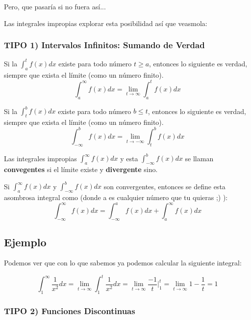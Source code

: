 \documentclass[12pt]{article}							    %
\begin{document}
Pero, que pasaría si no fuera así...

Las integrales impropias explorar esta posibilidad así que veasmola:

\subsubsection{TIPO 1) Intervalos Infinitos: Sumando de Verdad}

Si la $\int_a^t f(x) dx$ existe para todo número $t \geq a$, entonces lo siguiente es verdad, siempre que exista el límite (como un número finito).
\begin{equation}
    \int_a^{\infty} f(x) dx = \lim_{t \to \infty} \int_a^t f(x) dx
\end{equation}


Si la $\int_t^b f(x) dx$ existe para todo número $b \leq t$, entonces lo siguiente es verdad, siempre que exista el límite (como un número finito).
\begin{equation}
    \int_{- \infty}^b f(x) dx = \lim_{t \to - \infty} \int_t^b f(x) dx
\end{equation}


Las integrales impropias $\int_a^{\infty}f(x)dx$ y esta $\int_{-\infty}^bf(x)dx$ se llaman \textbf{convegentes} si el límite existe y  \textbf{divergente} sino.

Si $\int_a^{\infty}f(x)dx$ y $\int_{-\infty}^bf(x)dx$ son convergentes, entonces se define esta asombrosa integral como (donde a es cualquier número que tu quieras ;) ):
\begin{equation}
    \int_{-\infty}^{\infty} f(x) dx = \int_{-\infty}^{a} f(x) dx + \int_{a}^{\infty} f(x) dx   
\end{equation}


\subsection{Ejemplo}
Podemos ver que con lo que sabemos ya podemos calcular la siguiente integral:

\begin{equation*}
    \int_1^{\infty} \frac{1}{x^2} dx = \lim_{t \to \infty} \int_1^t \frac{1}{x^2} dx  =
    \lim_{t \to \infty}  \frac{-1}{t} \rvert_{1}^{t} = \lim_{t \to \infty}  1 - \frac{1}{t} = 1
\end{equation*}


\clearpage
\subsubsection{TIPO 2) Funciones Discontinuas}
\end{document}
